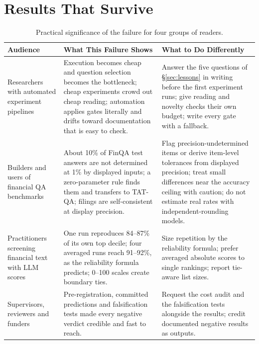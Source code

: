 \documentclass[11pt]{article}
\begin{document}
\section{Results That Survive}
\label{sec:salvage}

\begin{table}[!t]
\centering
\scriptsize
\renewcommand{\arraystretch}{1.18}
\begin{tabularx}{\textwidth}{@{}L{2.6cm}YY@{}}
\toprule
\textbf{Audience} & \textbf{What This Failure Shows} & \textbf{What to Do Differently} \\
\midrule
Researchers with automated experiment pipelines & Execution becomes cheap and question selection becomes the bottleneck; cheap experiments crowd out cheap reading; automation applies gates literally and drifts toward documentation that is easy to check. & Answer the five questions of \S\ref{sec:lessons} in writing before the first experiment runs; give reading and novelty checks their own budget; write every gate with a fallback. \\
Builders and users of financial QA benchmarks & About 10\% of FinQA test answers are not determined at 1\% by displayed inputs; a zero-parameter rule finds them and transfers to TAT-QA; filings are self-consistent at display precision. & Flag precision-undetermined items or derive item-level tolerances from displayed precision; treat small differences near the accuracy ceiling with caution; do not estimate real rates with independent-rounding models. \\
Practitioners screening financial text with LLM scores & One run reproduces 84--87\% of its own top decile; four averaged runs reach 91--92\%, as the reliability formula predicts; 0--100 scales create boundary ties. & Size repetition by the reliability formula; prefer averaged absolute scores to single rankings; report tie-aware list sizes. \\
Supervisors, reviewers and funders & Pre-registration, committed predictions and falsification tests made every negative verdict credible and fast to reach. & Request the cost audit and the falsification tests alongside the results; credit documented negative results as outputs. \\
\bottomrule
\end{tabularx}
\caption{Practical significance of the failure for four groups of readers.}
\label{tab:significance}
\end{table}
\end{document}
